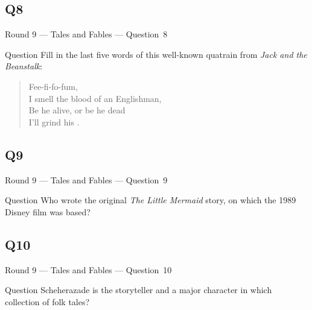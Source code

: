 \documentclass[11pt]{beamer}
\begin{document}
\subsection*{Q8}
\begin{frame}[t]{Round 9 --- Tales and Fables --- \mbox{Question 8}}
\vspace{-0.5em}
\begin{block}{Question}
Fill in the last five words of this well-known quatrain from \emph{Jack and the Beanstalk}:
\begin{quotation}
Fee-fi-fo-fum, \\
I smell the blood of an Englishman, \\
Be he alive, or be he dead \\
I'll grind his \textunderscore{}\textunderscore{}\textunderscore{}\textunderscore{}\textunderscore{} \textunderscore{}\textunderscore{}\textunderscore{}\textunderscore{}\textunderscore{} \textunderscore{}\textunderscore{}\textunderscore{}\textunderscore{}\textunderscore{} \textunderscore{}\textunderscore{}\textunderscore{}\textunderscore{}\textunderscore{} \textunderscore{}\textunderscore{}\textunderscore{}\textunderscore{}\textunderscore{}.
\end{quotation}
\end{block}
\end{frame}
\subsection*{Q9}
\begin{frame}[t]{Round 9 --- Tales and Fables --- \mbox{Question 9}}
\vspace{-0.5em}
\begin{block}{Question}
Who wrote the original \emph{The Little Mermaid} story, on which the 1989 Disney film was based?
\end{block}
\end{frame}
\subsection*{Q10}
\begin{frame}[t]{Round 9 --- Tales and Fables --- \mbox{Question 10}}
\vspace{-0.5em}
\begin{block}{Question}
Scheherazade is the storyteller and a major character in which collection of folk tales?
\end{block}
\end{frame}
\end{document}

